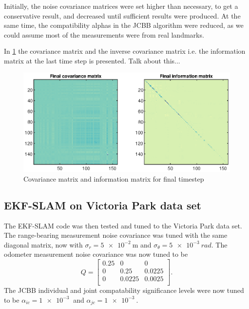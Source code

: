 Initially, the noise covariance matrices were set higher than necessary, to get a conservative result, and decreased until sufficient results were produced. At the same time, the compatibility alphas in the JCBB algorithm were reduced, as we could assume most of the measurements were from real landmarks.



In \cref{fig:ga_3_sim_P} the covariance matrix and the inverse covariance matrix i.e. the information matrix at the last time step is presented. Talk about this...

\begin{figure}[!htb]
    \centering
    \includegraphics[width=0.8\linewidth]{figures/ga_3/sim_P.eps}
    \caption{Covariance matrix and information matrix for final timestep}
    \label{fig:ga_3_sim_P}
\end{figure}


\subsection{EKF-SLAM on Victoria Park data set}

The EKF-SLAM code was then tested and tuned to the Victoria Park data set. The range-bearing measurement noise covariance was tuned with the same diagonal matrix, now with $\sigma_r = \SI{5e-2}{\meter}$ and $\sigma_\theta = \SI{5e-3}{rad}$. The odometer measurement noise covariance was now tuned to be
\begin{equation}
    Q = \begin{bmatrix}
        0.25 & 0 & 0 \\
        0 & 0.25 & 0.0225 \\
        0 & 0.0225 & 0.0025 \\
    \end{bmatrix}.
\end{equation}
The JCBB individual and joint compatability significance levels were now tuned to be $\alpha_{ic} = \SI{1e-3}{}$ and $\alpha_{jc} = \SI{1e-3}{}$.

